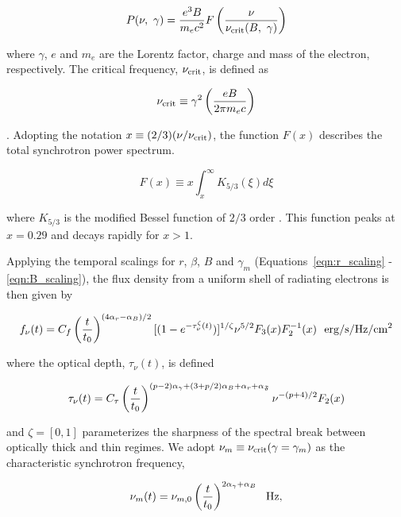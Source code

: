 \documentclass[12pt,preprint]{aastex}
\begin{document}
\begin{equation}
P(\nu,~\gamma)=\frac{e^3 B}{m_e c^2} F\left(\frac{\nu}{\nu_{\rm crit} (B,~\gamma)}\right)
\label{eqn:power}
\end{equation}

\noindent
where $\gamma$, $e$ and $m_e$ are the Lorentz factor, charge and mass
of the electron, respectively.  The critical frequency, $\nu_{\rm
crit}$, is defined as

\begin{equation}
\nu_{\rm crit}\equiv \gamma^2 \left( \frac{e B}{2\pi m_e c}\right)
\label{eqn:nu_crit}
\end{equation}

\noindent
 \citep{rl79}.  Adopting the notation $x\equiv (2/3)(\nu/\nu_{\rm crit})$, the
function $F(x)$ describes the total synchrotron power spectrum.

\begin{equation}
F(x)\equiv x \int_x^{\infty} K_{5/3}(\xi )d\xi
\label{eqn:F_x}
\end{equation}

\noindent
where $K_{5/3}$ is the modified Bessel function of $2/3$ order
 \citep{rl79}.  This function peaks at $x=0.29$ and
decays rapidly for $x > 1$. 

Applying the temporal scalings for $r$, $\beta$, $B$ and $\gamma_m$
(Equations~\ref{eqn:r_scaling} - \ref{eqn:B_scaling}), the flux density
from a uniform shell of radiating electrons is then given by

\begin{equation}
f_{\nu}(t)=C_f\left(\frac{t}{t_0}\right)^{(4\alpha_r-\alpha_B)/2} [(1-e^{-\tau_{\nu}^{\zeta}(t)})]^{1/\zeta} \nu^{5/2} F_3(x) F_2^{-1}(x)~~\rm erg/s/Hz/cm^{2}
\label{eqn:flux}
\end{equation}

\noindent
where the optical depth, $\tau_{\nu}(t)$, is defined

\begin{equation}
\tau_{\nu}(t)=C_{\tau}\left(\frac{t}{t_0}\right)^{(p-2)\alpha_{\gamma}+(3+p/2)\alpha_B+\alpha_r+\alpha_{\frak{F}}} \nu^{-(p+4)/2} F_2(x)
\label{eqn:tau}
\end{equation}

\noindent
and $\zeta=[0,1]$ parameterizes the sharpness of the spectral break between
optically thick and thin regimes.  We adopt
$\nu_m\equiv \nu_{\rm crit}(\gamma=\gamma_m)$ as the characteristic
synchrotron frequency,

\begin{equation}
\nu_m(t)=\nu_{m,0} \left(\frac{t}{t_0}\right)^{2\alpha_{\gamma}+\alpha_B}~~\rm Hz,
\label{eqn:nu_m}
\end{equation}
\end{document}
